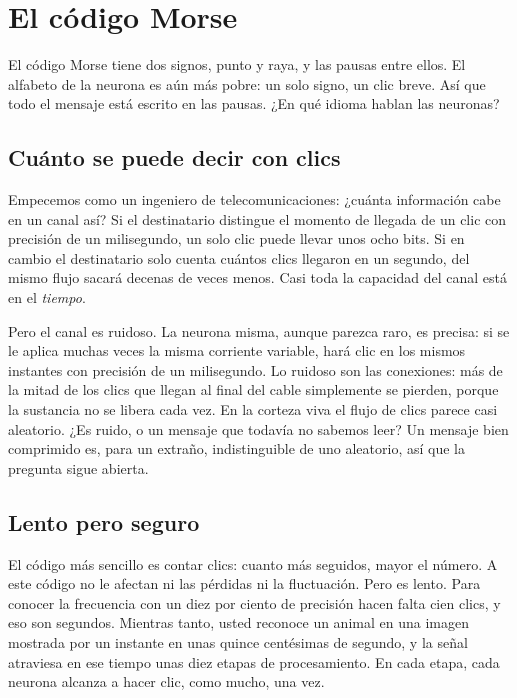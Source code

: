 \chapter{El código Morse}

El código Morse tiene dos signos, punto y raya, y las pausas entre ellos. El alfabeto de la neurona es aún más pobre: un solo signo, un clic breve. Así que todo el mensaje está escrito en las pausas. ¿En qué idioma hablan las neuronas?

\section*{Cuánto se puede decir con clics}

Empecemos como un ingeniero de telecomunicaciones: ¿cuánta información cabe en un canal así? Si el destinatario distingue el momento de llegada de un clic con precisión de un milisegundo, un solo clic puede llevar unos ocho bits. Si en cambio el destinatario solo cuenta cuántos clics llegaron en un segundo, del mismo flujo sacará decenas de veces menos. Casi toda la capacidad del canal está en el \emph{tiempo}.


Pero el canal es ruidoso. La neurona misma, aunque parezca raro, es precisa: si se le aplica muchas veces la misma corriente variable, hará clic en los mismos instantes con precisión de un milisegundo. Lo ruidoso son las conexiones: más de la mitad de los clics que llegan al final del cable simplemente se pierden, porque la sustancia no se libera cada vez. En la corteza viva el flujo de clics parece casi aleatorio. ¿Es ruido, o un mensaje que todavía no sabemos leer? Un mensaje bien comprimido es, para un extraño, indistinguible de uno aleatorio, así que la pregunta sigue abierta.

\section*{Lento pero seguro}

El código más sencillo es contar clics: cuanto más seguidos, mayor el número. A este código no le afectan ni las pérdidas ni la fluctuación. Pero es lento. Para conocer la frecuencia con un diez por ciento de precisión hacen falta cien clics, y eso son segundos. Mientras tanto, usted reconoce un animal en una imagen mostrada por un instante en unas quince centésimas de segundo, y la señal atraviesa en ese tiempo unas diez etapas de procesamiento. En cada etapa, cada neurona alcanza a hacer clic, como mucho, una vez.

